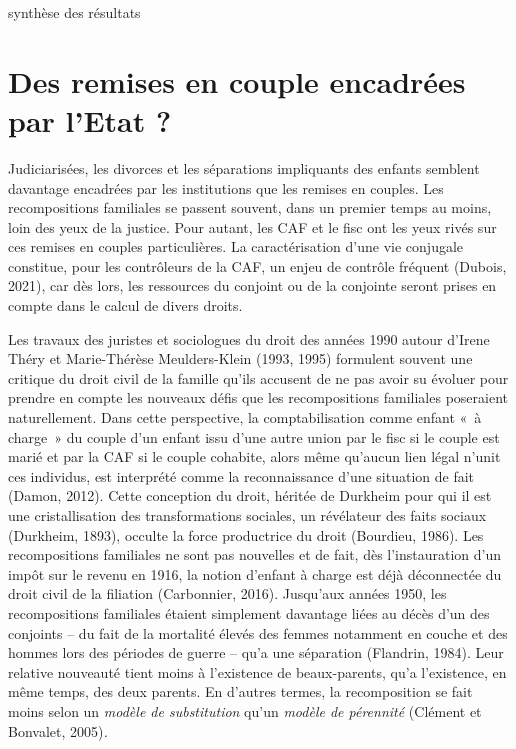 \documentclass[
  12pt,
]{book}
\begin{document}
synthèse des résultats

\section{Des remises en couple encadrées par l'Etat
?}\label{des-remises-en-couple-encadruxe9es-par-letat}

Judiciarisées, les divorces et les séparations impliquants des enfants
semblent davantage encadrées par les institutions que les remises en
couples. Les recompositions familiales se passent souvent, dans un
premier temps au moins, loin des yeux de la justice. Pour autant, les
CAF et le fisc ont les yeux rivés sur ces remises en couples
particulières. La caractérisation d'une vie conjugale constitue, pour
les contrôleurs de la CAF, un enjeu de contrôle fréquent (Dubois, 2021),
car dès lors, les ressources du conjoint ou de la conjointe seront
prises en compte dans le calcul de divers droits.

Les travaux des juristes et sociologues du droit des années 1990 autour
d'Irene Théry et Marie-Thérèse Meulders-Klein (1993, 1995) formulent
souvent une critique du droit civil de la famille qu'ils accusent de ne
pas avoir su évoluer pour prendre en compte les nouveaux défis que les
recompositions familiales poseraient naturellement. Dans cette
perspective, la comptabilisation comme enfant «~à charge~» du couple
d'un enfant issu d'une autre union par le fisc si le couple est marié et
par la CAF si le couple cohabite, alors même qu'aucun lien légal n'unit
ces individus, est interprété comme la reconnaissance d'une situation de
fait (Damon, 2012). Cette conception du droit, héritée de Durkheim pour
qui il est une cristallisation des transformations sociales, un
révélateur des faits sociaux (Durkheim, 1893), occulte la force
productrice du droit (Bourdieu, 1986). Les recompositions familiales ne
sont pas nouvelles et de fait, dès l'instauration d'un impôt sur le
revenu en 1916, la notion d'enfant à charge est déjà déconnectée du
droit civil de la filiation (Carbonnier, 2016). Jusqu'aux années 1950,
les recompositions familiales étaient simplement davantage liées au
décès d'un des conjoints -- du fait de la mortalité élevés des femmes
notamment en couche et des hommes lors des périodes de guerre -- qu'a
une séparation (Flandrin, 1984). Leur relative nouveauté tient moins à
l'existence de beaux-parents, qu'a l'existence, en même temps, des deux
parents. En d'autres termes, la recomposition se fait moins selon un
\emph{modèle de substitution} qu'un \emph{modèle de pérennité} (Clément
et Bonvalet, 2005)\emph{.}
\end{document}
